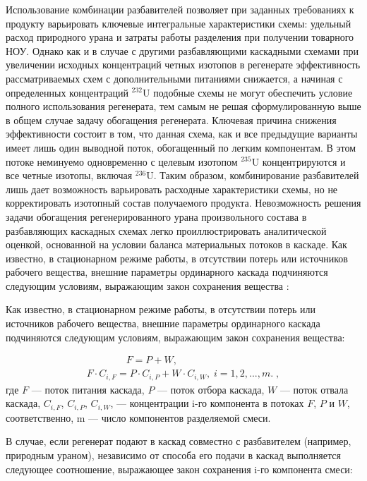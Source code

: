 Использование комбинации разбавителей позволяет при заданных требованиях к продукту варьировать ключевые интегральные характеристики схемы: удельный расход природного урана и затраты работы разделения при получении товарного НОУ. Однако как и в случае с другими разбавляющими каскадными схемами при увеличении исходных концентраций четных изотопов в регенерате эффективность рассматриваемых схем с дополнительными питаниями снижается, а начиная с определенных концентраций $^{232}$U подобные схемы не могут обеспечить условие полного использования регенерата, тем самым не решая сформулированную выше в общем случае задачу обогащения регенерата. Ключевая причина снижения эффективности состоит в том, что данная схема, как и все предыдущие варианты имеет лишь один выводной поток, обогащенный по легким компонентам. В этом потоке неминуемо одновременно с целевым изотопом $^{235}$U концентрируются и все четные изотопы, включая $^{236}$U. Таким образом, комбинирование разбавителей лишь дает возможность варьировать расходные характеристики схемы, но не корректировать изотопный состав получаемого продукта.
Невозможность решения задачи обогащения регенерированного урана произвольного состава в разбавляющих каскадных схемах легко проиллюстрировать аналитической оценкой, основанной на условии баланса материальных потоков в каскаде. 
Как известно, в стационарном режиме работы, в отсутствии потерь или источников рабочего вещества, внешние параметры ординарного каскада подчиняются следующим условиям, выражающим закон сохранения вещества \cite{sulaberidzeTeoriyaKaskadovDlya2011}:


Как известно, в стационарном режиме работы, в отсутствии потерь или источников рабочего вещества, внешние параметры ординарного каскада подчиняются следующим условиям, выражающим закон сохранения вещества:
				  
\begin{equation} \label{EQ__1} 
  \begin{array}{l} {\quad \quad \quad \quad F=P+W,} \\ {F \cdot C_{i,F} =P \cdot C_{i,P} +W \cdot C_{i,W} ,\; i=1,2,...,m. \; ,} \end{array}
\end{equation} 
где $F$ --- поток питания каскада, $P$ --- поток отбора каскада, $W$ --- поток отвала каскада, $C_{i,F}$, $C_{i,P}$, $C_{i,W}$, --- концентрации i-го компонента в потоках $F$, $P$ и $W$, соответственно, m --- число компонентов разделяемой смеси.

В случае, если регенерат подают в каскад совместно с разбавителем (например, природным ураном), независимо от способа его подачи в каскад выполняется следующее соотношение, выражающее закон сохранения i-го компонента смеси:

